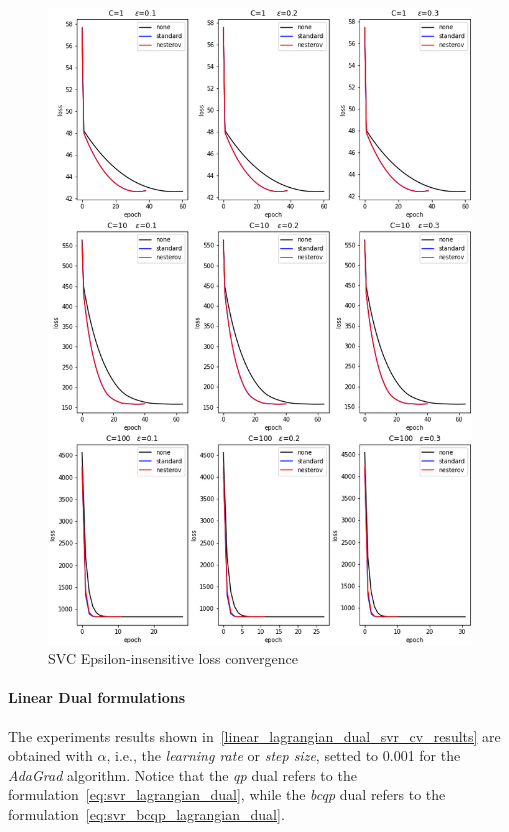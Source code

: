 \begin{figure}[H]
	\centering
	\includegraphics[scale=0.5]{img/svr_eps_loss_history}
	\caption{SVC Epsilon-insensitive loss convergence}
	\label{fig:svr_eps_loss_history}
\end{figure}

\pagebreak

\paragraph{Linear Dual formulations}

The experiments results shown in~\ref{linear_lagrangian_dual_svr_cv_results} are obtained with $\alpha$, i.e., the \emph{learning rate} or \emph{step size}, setted to 0.001 for the \emph{AdaGrad} algorithm. Notice that the \emph{qp} dual refers to the formulation~\eqref{eq:svr_lagrangian_dual}, while the \emph{bcqp} dual refers to the formulation~\eqref{eq:svr_bcqp_lagrangian_dual}.


